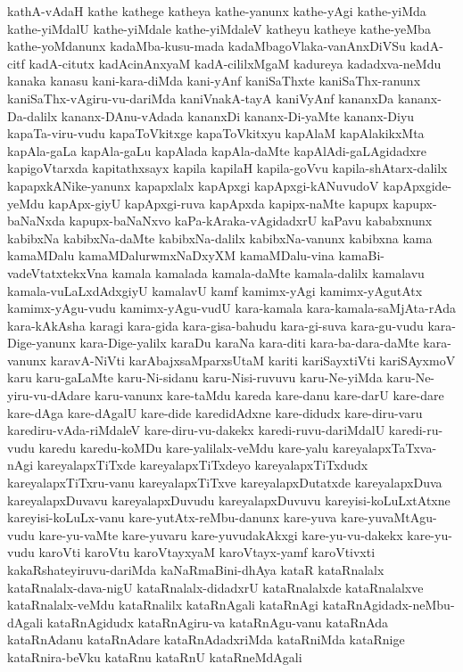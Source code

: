 {kathA-vAdaH
kathe
kathege
katheya
kathe-yanunx
kathe-yAgi
kathe-yiMda
kathe-yiMdalU
kathe-yiMdale
kathe-yiMdaleV
katheyu
katheye
kathe-yeMba
kathe-yoMdanunx
kadaMba-kusu-mada
kadaMbagoVlaka-vanAnxDiVSu
kadA-citf
kadA-citutx
kadAcinAnxyaM
kadA-cililxMgaM
kadureya
kadadxva-neMdu
kanaka
kanasu
kani-kara-diMda
kani-yAnf
kaniSaThxte
kaniSaThx-ranunx
kaniSaThx-vAgiru-vu-dariMda
kaniVnakA-tayA
kaniVyAnf
kananxDa
kananx-Da-dalilx
kananx-DAnu-vAdada
kananxDi
kananx-Di-yaMte
kananx-Diyu
kapaTa-viru-vudu
kapaToVkitxge
kapaToVkitxyu
kapAlaM
kapAlakikxMta
kapAla-gaLa
kapAla-gaLu
kapAlada
kapAla-daMte
kapAlAdi-gaLAgidadxre
kapigoVtarxda
kapitathxsayx
kapila
kapilaH
kapila-goVvu
kapila-shAtarx-dalilx
kapapxkANike-yanunx
kapapxlalx
kapApxgi
kapApxgi-kANuvudoV
kapApxgide-yeMdu
kapApx-giyU
kapApxgi-ruva
kapApxda
kapipx-naMte
kapupx
kapupx-baNaNxda
kapupx-baNaNxvo
kaPa-kAraka-vAgidadxrU
kaPavu
kababxnunx
kabibxNa
kabibxNa-daMte
kabibxNa-dalilx
kabibxNa-vanunx
kabibxna
kama
kamaMDalu
kamaMDalurwmxNaDxyXM
kamaMDalu-vina
kamaBi-vadeVtatxtekxVna
kamala
kamalada
kamala-daMte
kamala-dalilx
kamalavu
kamala-vuLaLxdAdxgiyU
kamalavU
kamf
kamimx-yAgi
kamimx-yAgutAtx
kamimx-yAgu-vudu
kamimx-yAgu-vudU
kara-kamala
kara-kamala-saMjAta-rAda
kara-kAkAsha
karagi
kara-gida
kara-gisa-bahudu
kara-gi-suva
kara-gu-vudu
kara-Dige-yanunx
kara-Dige-yalilx
karaDu
karaNa
kara-diti
kara-ba-dara-daMte
kara-vanunx
karavA-NiVti
karAbajxsaMparxsUtaM
kariti
kariSayxtiVti
kariSAyxmoV
karu
karu-gaLaMte
karu-Ni-sidanu
karu-Nisi-ruvuvu
karu-Ne-yiMda
karu-Ne-yiru-vu-dAdare
karu-vanunx
kare-taMdu
kareda
kare-danu
kare-darU
kare-dare
kare-dAga
kare-dAgalU
kare-dide
karedidAdxne
kare-didudx
kare-diru-varu
karediru-vAda-riMdaleV
kare-diru-vu-dakekx
karedi-ruvu-dariMdalU
karedi-ru-vudu
karedu
karedu-koMDu
kare-yalilalx-veMdu
kare-yalu
kareyalapxTaTxva-nAgi
kareyalapxTiTxde
kareyalapxTiTxdeyo
kareyalapxTiTxdudx
kareyalapxTiTxru-vanu
kareyalapxTiTxve
kareyalapxDutatxde
kareyalapxDuva
kareyalapxDuvavu
kareyalapxDuvudu
kareyalapxDuvuvu
kareyisi-koLuLxtAtxne
kareyisi-koLuLx-vanu
kare-yutAtx-reMbu-danunx
kare-yuva
kare-yuvaMtAgu-vudu
kare-yu-vaMte
kare-yuvaru
kare-yuvudakAkxgi
kare-yu-vu-dakekx
kare-yu-vudu
karoVti
karoVtu
karoVtayxyaM
karoVtayx-yamf
karoVtivxti
kakaRshateyiruvu-dariMda
kaNaRmaBini-dhAya
kataR
kataRnalalx
kataRnalalx-dava-nigU
kataRnalalx-didadxrU
kataRnalalxde
kataRnalalxve
kataRnalalx-veMdu
kataRnalilx
kataRnAgali
kataRnAgi
kataRnAgidadx-neMbu-dAgali
kataRnAgidudx
kataRnAgiru-va
kataRnAgu-vanu
kataRnAda
kataRnAdanu
kataRnAdare
kataRnAdadxriMda
kataRniMda
kataRnige
kataRnira-beVku
kataRnu
kataRnU
kataRneMdAgali
}
